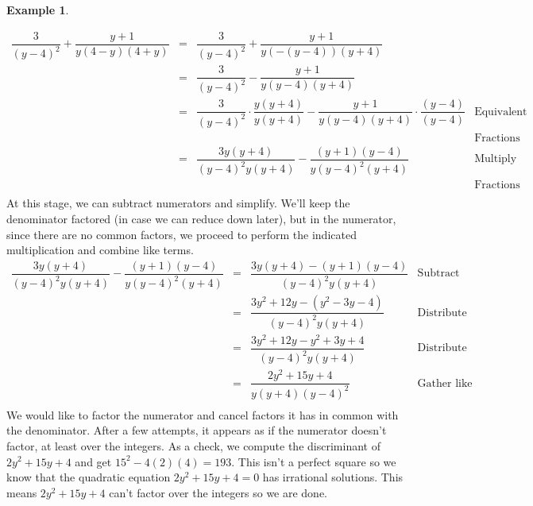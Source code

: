 \documentclass[11pt]{article}
\theoremstyle{definition}  %
\newtheorem{ex}{\bf Example}
\begin{document}
\begin{ex}
\begin{enumerate}
\[\begin{array}{rclr}
\dfrac{3}{(y-4)^2} + \dfrac{y+1}{y(4-y)(4+y)} & = & \dfrac{3}{(y-4)^2} + \dfrac{y+1}{y(-(y-4))(y+4)} &   \\ [8pt]
																							& = & \dfrac{3}{(y-4)^2} - \dfrac{y+1}{y(y-4)(y+4)} & \\ [10pt]
																							& = & \dfrac{3}{(y-4)^2} \cdot \dfrac{y(y+4)}{y(y+4)} - \dfrac{y+1}{y(y-4)(y+4)} \cdot \dfrac{(y-4)}{(y-4)} & \text{Equivalent} \\[-8pt]                                             &   &                                                                                                       & \text{Fractions} \\
																						& = & \dfrac{3y(y+4)}{(y-4)^2y(y+4)}  - \dfrac{(y+1)(y-4)}{y(y-4)^2(y+4)}  & \text{Multiply} \\ [-8pt]
																						&   &                                                                      & \text{Fractions} \\	\end{array}\] At this stage, we can subtract numerators and simplify. We'll keep the denominator factored (in case we can reduce down later), but in the numerator, since there are no common factors, we proceed to perform the indicated multiplication and combine like terms.\[ \begin{array}{rclr}

 \dfrac{3y(y+4)}{(y-4)^2y(y+4)}  - \dfrac{(y+1)(y-4)}{y(y-4)^2(y+4)} & = &  \dfrac{3y(y+4) -(y+1)(y-4)}{(y-4)^2y(y+4)}  & \text{Subtract numerators} \\ [10pt]

& = & \dfrac{3y^2 + 12y - (y^2 - 3y - 4)}{(y-4)^2 y (y+4)} & \text{Distribute} \\ [10pt]

& = & \dfrac{3y^2 + 12y - y^2 + 3y + 4}{(y-4)^2 y (y+4)} & \text{Distribute} \\ [10pt]

& = & \dfrac{2y^2 + 15y + 4}{y (y+4) (y-4)^2} & \text{Gather like terms} \\ \end{array}\] We would like to factor the numerator and cancel factors it has in common with the denominator.  After a few attempts, it appears as if the numerator doesn't factor, at least over the integers.  As a check, we compute the discriminant of $2y^2 + 15y + 4$ and get $15^2 - 4(2)(4) = 193$.  This isn't a perfect square so we know that the quadratic equation $2y^2 + 15y + 4=0$ has irrational solutions. This means $2y^2 + 15y + 4$  can't factor over the integers so we are done.  


\end{enumerate}
\end{ex}
\end{document}
